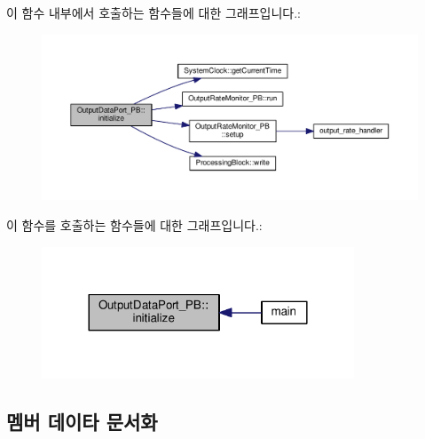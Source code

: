 이 함수 내부에서 호출하는 함수들에 대한 그래프입니다.\+:\nopagebreak
\begin{figure}[H]
\begin{center}
\leavevmode
\includegraphics[width=350pt]{classOutputDataPort__PB_a7b98a0affb81a4c74a8dfc70eac515ba_cgraph}
\end{center}
\end{figure}




이 함수를 호출하는 함수들에 대한 그래프입니다.\+:\nopagebreak
\begin{figure}[H]
\begin{center}
\leavevmode
\includegraphics[width=264pt]{classOutputDataPort__PB_a7b98a0affb81a4c74a8dfc70eac515ba_icgraph}
\end{center}
\end{figure}




\subsection{멤버 데이타 문서화}
